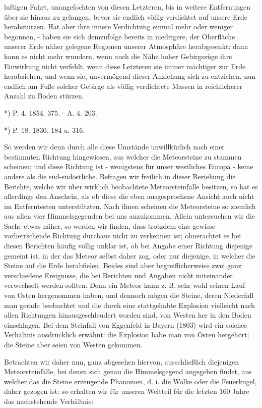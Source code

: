 \documentclass[a4paper, 8pt, oneside, polutonikogreek, german]{article}
\begin{document}
luftigen Fahrt, unangefochten von diesen Letzteren, bis in weitere Entfernungen über sie hinaus zu gelangen, bevor sie endlich völlig verdichtet auf unsere Erde herabstürzen. Hat aber ihre innere Verdichtung einmal mehr oder weniger begonnen, - haben sie sich demzufolge bereits in niedrigere, der Oberfläche unserer Erde näher gelegene Regionen unserer Atmosphäre herabgesenkt: dann kann es nicht mehr wundern, wenn auch die Nähe hoher Gebirgszüge ihre Einwirkung nicht verfehlt, wenn diese Letzteren sie immer mächtiger zur Erde herabziehen, und wenn sie, unvermögend dieser Anziehung sich zu entziehen, nun endlich am Fuße solcher Gebirge als völlig verdichtete Massen in reichlicherer Anzahl zu Boden stürzen.

*) P. 4. 1854. 375. - A. 4. 203.

*) P. 18. 1830. 184 u. 316.

So werden wir denn durch alle diese Umstände unwillkürlich nach einer bestimmten Richtung hingewiesen, aus welcher die Meteorsteine zu stammen scheinen; und diese Richtung ist - wenigstens für unser westliches Europa - keine andere als die süd-südöstliche. Befragen wir freilich in dieser Beziehung die Berichte, welche wir über wirklich beobachtete Meteorsteinfälle besitzen, so hat es allerdings den Anschein, als ob diese die eben ausgesprochene Ansicht auch nicht im Entferntesten unterstützten. Nach ihnen scheinen die Meteorsteine so ziemlich aus allen vier Himmelsgegenden bei uns anzukommen. Allein untersuchen wir die Sache etwas näher, so werden wir finden, dass trotzdem eine gewisse vorherrschende Richtung durchaus nicht zu verkennen ist; ohnerachtet es bei diesen Berichten häufig völlig unklar ist, ob bei Angabe einer Richtung diejenige gemeint ist, in der das Meteor selbst daher zog, oder nur diejenige, in welcher die Steine auf die Erde herabfielen. Beides sind aber begreiflicherweise zwei ganz verschiedene Ereignisse, die bei Berichten und Angaben nicht miteinander verwechselt werden sollten. Denn ein Meteor kann z. B. sehr wohl seinen Lauf von Osten hergenommen haben, und dennoch mögen die Steine, deren Niederfall man gerade beobachtet und die durch eine stattgehabte Explosion vielleicht nach allen Richtungen hinausgeschleudert worden sind, von Westen her in den Boden einschlagen. Bei dem Steinfall von Eggenfeld in Bayern (1803) wird ein solches Verhältnis ausdrücklich erwähnt: die Explosion habe man von Osten hergehört; die Steine aber seien von Westen gekommen.

Betrachten wir daher nun, ganz abgesehen hiervon, ausschließlich diejenigen Meteorsteinfälle, bei denen sich genau die Himmelsgegend angegeben findet, aus welcher das die Steine erzeugende Phänomen, d. i. die Wolke oder die Feuerkugel, daher gezogen ist: so erhalten wir für unseren Weltteil für die letzten 160 Jahre das nachstehende Verhältnis:
\end{document}
